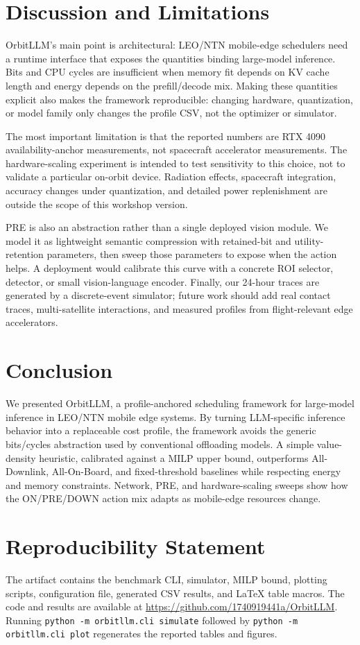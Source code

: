 \section{Discussion and Limitations}
\label{sec:discuss}

OrbitLLM's main point is architectural: LEO/NTN mobile-edge schedulers need a runtime interface that exposes the quantities binding large-model inference. Bits and CPU cycles are insufficient when memory fit depends on KV cache length and energy depends on the prefill/decode mix. Making these quantities explicit also makes the framework reproducible: changing hardware, quantization, or model family only changes the profile CSV, not the optimizer or simulator.

The most important limitation is that the reported numbers are RTX 4090 availability-anchor measurements, not spacecraft accelerator measurements. The hardware-scaling experiment is intended to test sensitivity to this choice, not to validate a particular on-orbit device. Radiation effects, spacecraft integration, accuracy changes under quantization, and detailed power replenishment are outside the scope of this workshop version.

PRE is also an abstraction rather than a single deployed vision module. We model it as lightweight semantic compression with retained-bit and utility-retention parameters, then sweep those parameters to expose when the action helps. A deployment would calibrate this curve with a concrete ROI selector, detector, or small vision-language encoder. Finally, our 24-hour traces are generated by a discrete-event simulator; future work should add real contact traces, multi-satellite interactions, and measured profiles from flight-relevant edge accelerators.

\section{Conclusion}
\label{sec:conclusion}
We presented OrbitLLM, a profile-anchored scheduling framework for large-model inference in LEO/NTN mobile edge systems. By turning LLM-specific inference behavior into a replaceable cost profile, the framework avoids the generic bits/cycles abstraction used by conventional offloading models. A simple value-density heuristic, calibrated against a MILP upper bound, outperforms All-Downlink, All-On-Board, and fixed-threshold baselines while respecting energy and memory constraints. Network, PRE, and hardware-scaling sweeps show how the ON/PRE/DOWN action mix adapts as mobile-edge resources change.

\section*{Reproducibility Statement}
The artifact contains the benchmark CLI, simulator, MILP bound, plotting scripts, configuration file, generated CSV results, and LaTeX table macros. The code and results are available at \url{https://github.com/1740919441a/OrbitLLM}. Running \texttt{python -m orbitllm.cli simulate} followed by \texttt{python -m orbitllm.cli plot} regenerates the reported tables and figures.
